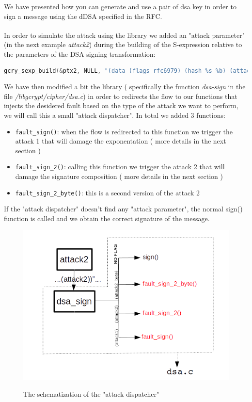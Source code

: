 \documentclass[11pt,english]{article}
\begin{document}
We have presented how you can generate and use a pair of dsa key in order to sign a message using the dDSA specified in the RFC\cite{rfc}. \\\\
In order to simulate the attack using the library we added an "attack parameter" (in the next example \textit{attack2}) during the building of the S-expression relative to the parameters of the DSA signing transformation:

\begin{lstlisting}[language=c]
gcry_sexp_build(&ptx2, NULL, "(data (flags rfc6979) (hash %s %b) (attack2))" , "sha1", hash_len , digest);
\end{lstlisting}

We have then modified a bit the library ( specifically the function \textit{dsa-sign} in the file \textit{/libgcrypt/cipher/dsa.c}) in order to redirects the flow to our functions that injects the desidered fault based on the type of the attack we want to perform, we will call this a small "attack dispatcher". In total we added 3 functions:
\begin{itemize}
\item \texttt{fault\_sign()}: when the flow is redirected to this function we trigger the attack 1 that will damage the exponentation ( more details in the next section )
\item \texttt{fault\_sign\_2()}: calling this function we trigger the attack 2 that will damage the signature composition ( more details in the next section )
\item \texttt{fault\_sign\_2\_byte()}: this is a second version of the attack 2
\end{itemize}

If the "attack dispatcher" doesn't find any "attack parameter", the normal sign() function is called and we obtain the correct signature of the message. 

\begin{figure}[H]
\includegraphics[width=1.0\textwidth]{img/img_3.png} \\
\caption{The schematization of the "attack dispatcher"}
\end{figure}
\end{document}
